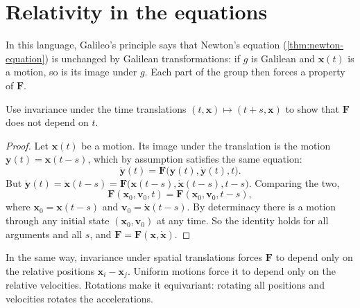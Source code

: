 \section{Relativity in the equations}\label{sec:relativity-equations}

In this language, Galileo's principle says that Newton's equation
(\cref{thm:newton-equation}) is unchanged by Galilean transformations: if
$g$ is Galilean and $\mathbf x(t)$ is a motion, so is its image under $g$.
Each part of the group then forces a property of $\mathbf F$.

\begin{exercise}\label{ex:time-homogeneity}
  Use invariance under the time translations $(t, \mathbf x) \mapsto (t + s, \mathbf x)$
  to show that $\mathbf F$ does not depend on $t$.
\end{exercise}

\begin{proof}
  Let $\mathbf x(t)$ be a motion. Its image under the translation is the
  motion $\mathbf y(t) = \mathbf x(t - s)$, which by assumption satisfies the
  same equation:
  \[
    \ddot{\mathbf y}(t) = \mathbf F\bigl(\mathbf y(t), \dot{\mathbf y}(t), t\bigr).
  \]
  But $\ddot{\mathbf y}(t) = \ddot{\mathbf x}(t - s)
  = \mathbf F\bigl(\mathbf x(t - s), \dot{\mathbf x}(t - s), t - s\bigr)$.
  Comparing the two,
  \[
    \mathbf F(\mathbf x_0, \mathbf v_0, t) = \mathbf F(\mathbf x_0, \mathbf v_0, t - s),
  \]
  where $\mathbf x_0 = \mathbf x(t - s)$ and $\mathbf v_0 = \dot{\mathbf x}(t - s)$.
  By determinacy there is a motion through any initial state
  $(\mathbf x_0, \mathbf v_0)$ at any time. So the identity holds for all
  arguments and all $s$, and $\mathbf F = \mathbf F(\mathbf x, \dot{\mathbf x})$.
\end{proof}

\begin{remark}
  In the same way, invariance under spatial translations forces $\mathbf F$ to
  depend only on the relative positions $\mathbf x_i - \mathbf x_j$. Uniform
  motions force it to depend only on the relative velocities. Rotations make
  it equivariant: rotating all positions and velocities rotates the
  accelerations.
\end{remark}
